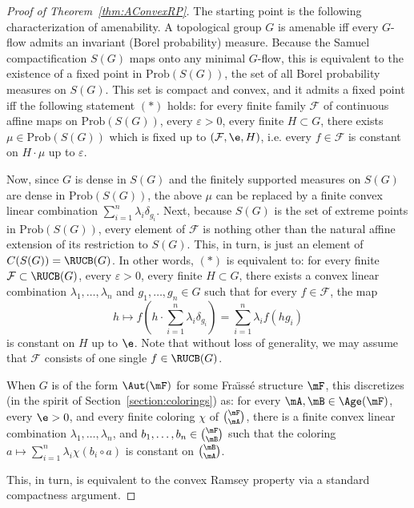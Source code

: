 \begin{proof}[Proof of Theorem~\ref{thm:AConvexRP}]
The starting point is the following characterization of amenability. A topological group $G$ is amenable iff every $G$-flow admits an invariant (Borel probability) measure. Because the Samuel compactification $S(G)$ maps onto any minimal $G$-flow, this is equivalent to the existence of a fixed point in $\mathrm{Prob}(S(G))$, the set of all Borel probability measures on $S(G)$. This set is compact and convex, and it admits a fixed point iff the following statement $(*)$ holds: for every finite family $\mathcal F$ of continuous affine maps on $\mathrm{Prob}(S(G))$, every $\varepsilon >0$, every finite $H\subset G$, there exists $\mu \in \mathrm{Prob}(S(G))$ which is fixed up to $(\mathcal F, \e, H)$, i.e. every $f\in \mathcal F$ is constant on $H\cdot\mu$ up to $\varepsilon$.

Now, since $G$ is dense in $S(G)$ and the finitely supported measures on $S(G)$ are dense in $\mathrm{Prob}(S(G))$, the above $\mu$ can be replaced by a finite convex linear combination $\sum_{i=1}^{n}\lambda_{i}\delta_{g_{i}}$. Next, because $S(G)$ is the set of extreme points in $ \mathrm{Prob}(S(G))$, every element of $\mathcal F$ is nothing other than the natural affine extension of its restriction to $S(G)$. This, in turn, is just an element of $C(S(G))=\RUCB(G)$. In other words, $(*)$ is equivalent to: for every finite $\mathcal F \subset \RUCB(G)$, every $\varepsilon >0$, every finite $H\subset G$, there exists a convex linear combination $\lambda_{1},\ldots, \lambda_{n}$ and $g_{1},\ldots,g_{n}\in G$ such that for every $f\in \mathcal F$, the map
\[
h\mapsto f\!\left(h\cdot \sum_{i=1}^{n}\lambda_{i}\delta_{g_{i}}\right)=\sum_{i=1}^{n}\lambda_{i}f(hg_{i})
\]
is constant on $H$ up to $\e$. Note that without loss of generality, we may assume that $\mathcal F$ consists of one single $f\in \RUCB(G)$.

When $G$ is of the form $\Aut(\mF)$ for some Fra\"{\i}ss\'e structure $\mF$, this discretizes (in the spirit of Section~\ref{section:colorings}) as: for every $\mA, \mB \in \Age(\mF)$, every $\e>0$, and every finite coloring $\chi$ of $\binom{\mF}{\mA}$, there is a finite convex linear combination $\lambda_{1},\ldots,\lambda_{n}$, and $b_{1},\ldots,b_{n}\in \binom{\mF}{\mB}$ such that the coloring $a\mapsto \sum_{i=1}^{n}\lambda_{i}\chi(b_{i}\circ a)$ is constant on $\binom{\mB}{\mA}$.

This, in turn, is equivalent to the convex Ramsey property via a standard compactness argument.
\end{proof}

